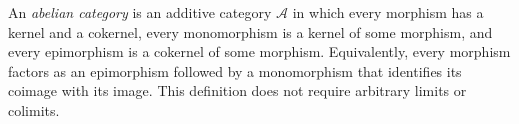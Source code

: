 
An \emph{abelian category} is an additive category $\mathcal A$ in which every morphism has a kernel and a cokernel, every monomorphism is a kernel of some morphism, and every epimorphism is a cokernel of some morphism. Equivalently, every morphism factors as an epimorphism followed by a monomorphism that identifies its coimage with its image. This definition does not require arbitrary limits or colimits.

